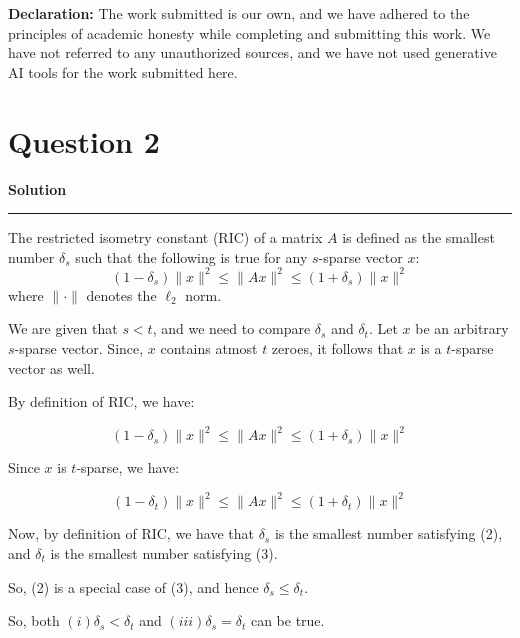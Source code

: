 \documentclass[a4paper,12pt]{article}
\title{\cooltitle{CS754 Assignment-1}}
\author{{\bf Saksham Rathi, Ekansh Ravi Shankar, Kshitij Vaidya}}
\date{}
\newenvironment{solution}[2][]{%
    \begin{mdframed}[linecolor=blue!70!black, linewidth=2pt, roundcorner=10pt, backgroundcolor=yellow!10!white, skipabove=12pt, skipbelow=12pt]%
        \textbf{\large #2}
        \par\noindent\rule{\textwidth}{0.4pt}
}{
    \end{mdframed}
}
\begin{document}
\maketitle
\textbf{Declaration:} The work submitted is our own, and
we have adhered to the principles of academic honesty while completing and submitting this work. We have not referred to any unauthorized sources, and we have not used generative AI tools for the work submitted here.



\section*{Question 2}

\begin{solution}{Solution}
  The restricted isometry constant (RIC) of a
 matrix $A$ is defined as the smallest number $\delta_s$ such that the following is true for any $s$-sparse vector $x$:
  \begin{equation}
    (1-\delta_s) \lVert x \rVert^2 \leq \lVert Ax \rVert^2 \leq (1+\delta_s) \lVert x \rVert^2
  \end{equation}
  where $\lVert \cdot \rVert$ denotes the $\ell_2$ norm. 

  We are given that $s < t$, and we need to compare $\delta_s$ and $\delta_t$. Let $x$ be an arbitrary $s$-sparse vector. Since, $x$ contains atmost $t$ zeroes, it follows that $x$ is a $t$-sparse vector as well. 

  By definition of RIC, we have:

  \begin{equation}
    (1-\delta_s) \lVert x \rVert^2 \leq \lVert Ax \rVert^2 \leq (1+\delta_s) \lVert x \rVert^2
  \end{equation}

  Since $x$ is $t$-sparse, we have:

  \begin{equation}
    (1-\delta_t) \lVert x \rVert^2 \leq \lVert Ax \rVert^2 \leq (1+\delta_t) \lVert x \rVert^2
  \end{equation}

  Now, by definition of RIC, we have that $\delta_s$ is the smallest number satisfying (2), and $\delta_t$ is the smallest number satisfying (3). 
  
  So, (2) is a special case of (3), and hence $\delta_s \leq \delta_t$.

  So, both $(i) \delta_s < \delta_t$ and $(iii) \delta_s = \delta_t$ can be true.

\end{solution}
\end{document}
